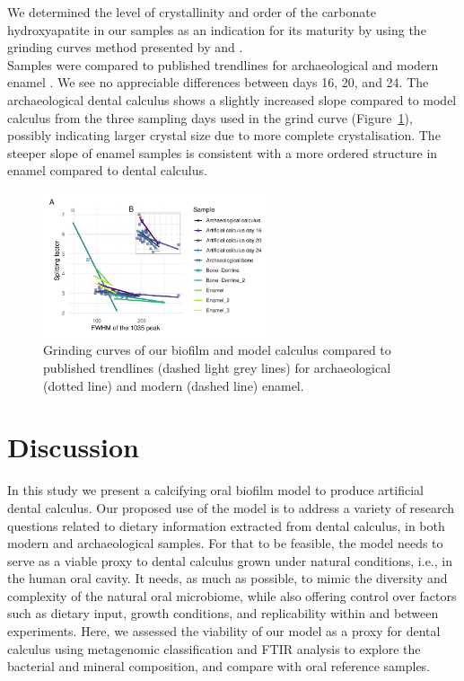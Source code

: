 \documentclass[10pt,a4paper]{article}
\begin{document}
We determined the level of crystallinity and order of the carbonate
hydroxyapatite in our samples as an indication for its maturity by using
the grinding curves method presented by
\citep{asscherAtomicDisorder2011} and
\citep{asscherVariationsAtomic2011}.\\
Samples were compared to published trendlines for archaeological and
modern enamel \citep{asscherAtomicDisorder2011}. We see no appreciable
differences between days 16, 20, and 24. The archaeological dental
calculus shows a slightly increased slope compared to model calculus
from the three sampling days used in the grind curve
(Figure~\ref{fig-grind-curve}), possibly indicating larger crystal size
due to more complete crystalisation. The steeper slope of enamel samples
is consistent with a more ordered structure in enamel compared to dental
calculus.


\begin{figure}
    \centering
    \includegraphics[width=0.6\textwidth]{figures/fig-grind-curve-1.pdf}
    \caption{\label{fig-grind-curve}Grinding curves of our biofilm and model
calculus compared to published trendlines (dashed light grey lines) for
archaeological (dotted line) and modern (dashed line) enamel.}
\end{figure}

\section*{Discussion}\label{discussion}

In this study we present a calcifying oral biofilm model to produce
artificial dental calculus. Our proposed use of the model is to address
a variety of research questions related to dietary information extracted
from dental calculus, in both modern and archaeological samples. For
that to be feasible, the model needs to serve as a viable proxy to
dental calculus grown under natural conditions, i.e., in the human oral
cavity. It needs, as much as possible, to mimic the diversity and
complexity of the natural oral microbiome, while also offering control
over factors such as dietary input, growth conditions, and replicability
within and between experiments. Here, we assessed the viability of our
model as a proxy for dental calculus using metagenomic classification
and FTIR analysis to explore the bacterial and mineral composition, and
compare with oral reference samples.
\end{document}
